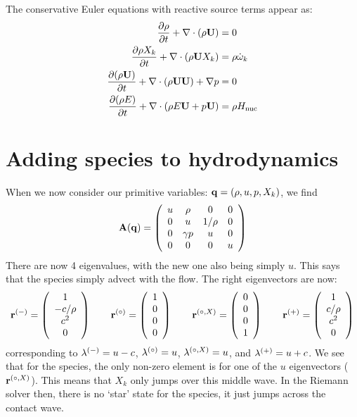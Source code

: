 The conservative Euler equations with reactive source terms
appear as:
\begin{align}
{\frac{{\partial\rho}}{\partial t}} + \nabla \cdot (\rho {\bf U}) &= 0 \\
{\frac{{\partial\rho X_k}}{\partial t}} + \nabla \cdot (\rho {\bf U} X_k) &= \rho {\dot{\omega}}_k \\
{\frac{{\partial(\rho {\bf U})}}{\partial t}} + \nabla \cdot (\rho {\bf U} {\bf U}) + \nabla p &= 0 \\
{\frac{{\partial(\rho E)}}{\partial t}} + \nabla \cdot (\rho E {\bf U} + p {\bf U} ) &= \rho {H_\mathrm{nuc}}
\end{align}


\section{Adding species to hydrodynamics}

When we now consider our primitive variables: ${\bf q} = (\rho, u, p, X_k)$,
we find
\begin{equation}
{\bf A}({\bf q}) = \left ( \begin{array}{cccc} u  & \rho     & 0      &  0\\
                                  0  &  u       & 1/\rho &  0\\
                                  0  & \gamma p & u      &  0\\
                                  0  & 0        & 0      & u \end{array} \right )
\end{equation}
There are now 4 eigenvalues, with the new one also being simply $u$.
This says that the species simply advect with the flow.  The right
eigenvectors are now:
\begin{equation}
\rb^\evm = \left ( \begin{array}{c} 1 \\ -c/\rho \\ c^2 \\ 0\end{array} \right )
%
\qquad
\rb^\evz = \left ( \begin{array}{c} 1 \\ 0 \\ 0  \\ 0\end{array} \right )
%
\qquad
\rb^\evzs{X} = \left ( \begin{array}{c} 0 \\ 0  \\ 0 \\ 1 \end{array} \right )
%
\qquad
\rb^\evp = \left ( \begin{array}{c} 1 \\ c/\rho \\ c^2 \\ 0 \end{array} \right )
\end{equation}
corresponding to $\lambda^{(-)} = u -c$, $\lambda^{(\circ)} = u$,
$\lambda^{(\circ,X)} = u$, and $\lambda^{(+)} = u + c$.  We see that for
the species, the only non-zero element is for one of the $u$
eigenvectors (${\bf r}^{(\circ,X)}$).  This means that $X_k$ only jumps over
this middle wave.  In the Riemann solver then, there is no `star'
state for the species, it just jumps across the contact wave.

